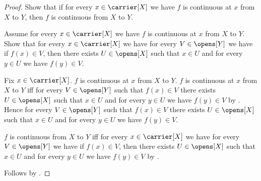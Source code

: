 \begin{proof}
    Show that if for every $x\in\carrier[X]$ we have
        $f$ is continuous at $x$ from $X$ to $Y$, then
        $f$ is continuous from $X$ to $Y$.
    \begin{subproof}
        Assume for every $x\in\carrier[X]$ we have
            $f$ is continuous at $x$ from $X$ to $Y$.
        Show that for every $x\in\carrier[X]$ we have
            for every $V\in\opens[Y]$ we have if $f(x)\in V$, then
            there exists $U\in\opens[X]$ such that $x\in U$ and
                for every $y\in U$ we have $f(y)\in V$.
        \begin{subproof}
            Fix $x\in\carrier[X]$.
            $f$ is continuous at $x$ from $X$ to $Y$.
            $f$ is continuous at $x$ from $X$ to $Y$ iff
                for every $V\in\opens[Y]$ such that $f(x)\in V$ there exists
                $U\in\opens[X]$ such that $x\in U$ and
                for every $y\in U$ we have $f(y)\in V$ by
                .
            Hence for every $V\in\opens[Y]$ such that $f(x)\in V$ there
                exists $U\in\opens[X]$ such that $x\in U$ and
                for every $y\in U$ we have $f(y)\in V$.
        \end{subproof}
        $f$ is continuous from $X$ to $Y$ iff
            for every $x\in\carrier[X]$ we have
            for every $V\in\opens[Y]$ we have if $f(x)\in V$, then there
            exists $U\in\opens[X]$ such that $x\in U$ and
                for every $y\in U$ we have $f(y)\in V$ by
            .
    \end{subproof}
    Follows by \auto.
\end{proof}

